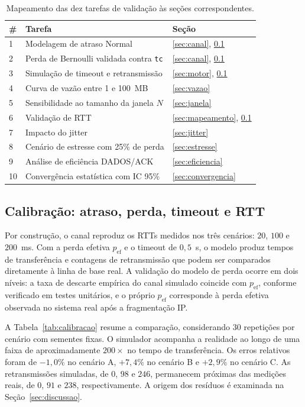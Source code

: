 \documentclass[12pt]{article}
\begin{document}
\begin{table}[ht]
\centering
\caption{Mapeamento das dez tarefas de validação às seções correspondentes.}
\label{tab:tarefas}
\begin{tabular}{lll}
\toprule
\textbf{\#} & \textbf{Tarefa} & \textbf{Seção} \\
\midrule
1  & Modelagem de atraso Normal             & \ref{sec:canal}, \ref{sec:calibracao} \\
2  & Perda de Bernoulli validada contra \texttt{tc} & \ref{sec:canal}, \ref{sec:calibracao} \\
3  & Simulação de timeout e retransmissão   & \ref{sec:motor}, \ref{sec:calibracao} \\
4  & Curva de vazão entre 1 e 100~MB         & \ref{sec:vazao} \\
5  & Sensibilidade ao tamanho da janela $N$  & \ref{sec:janela} \\
6  & Validação de RTT                        & \ref{sec:mapeamento}, \ref{sec:calibracao} \\
7  & Impacto do jitter                       & \ref{sec:jitter} \\
8  & Cenário de estresse com 25\% de perda   & \ref{sec:estresse} \\
9  & Análise de eficiência DADOS/ACK         & \ref{sec:eficiencia} \\
10 & Convergência estatística com IC 95\%    & \ref{sec:convergencia} \\
\bottomrule
\end{tabular}
\end{table}

\subsection{Calibração: atraso, perda, timeout e RTT}
\label{sec:calibracao}

Por construção, o canal reproduz os RTTs medidos nos três cenários: $20$, $100$ e
$200$~ms. Com a perda efetiva $p_{\text{ef}}$ e o timeout de $0{,}5$~s, o modelo produz
tempos de transferência e contagens de retransmissão que podem ser comparados diretamente
à linha de base real. A validação do modelo de perda ocorre em dois níveis: a taxa de
descarte empírica do canal simulado coincide com $p_{\text{ef}}$, conforme verificado em
testes unitários, e o próprio $p_{\text{ef}}$ corresponde à perda efetiva observada no
sistema real após a fragmentação IP.

A Tabela~\ref{tab:calibracao} resume a comparação, considerando 30 repetições por cenário
com sementes fixas. O simulador acompanha a realidade ao longo de uma faixa de
aproximadamente $200\times$ no tempo de transferência. Os erros relativos foram de
$-1{,}0\%$ no cenário A, $+7{,}4\%$ no cenário B e $+2{,}9\%$ no cenário C. As
retransmissões simuladas, de $0$, $98$ e $246$, permanecem próximas das medições reais, de
$0$, $91$ e $238$, respectivamente. A origem dos resíduos é examinada na
Seção~\ref{sec:discussao}.
\end{document}
